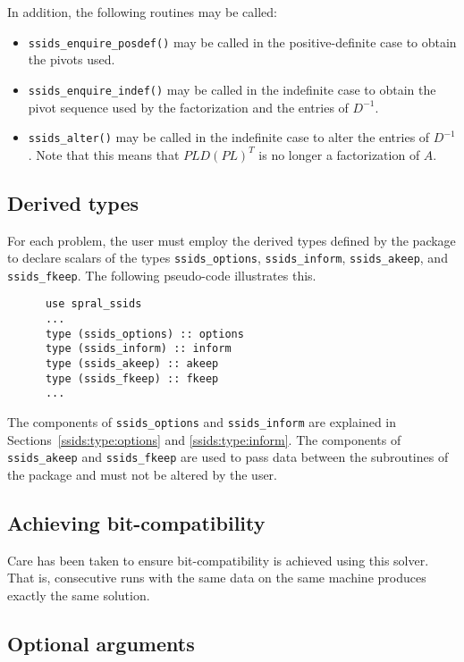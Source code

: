 \noindent
In addition, the following routines may be called:
\begin{itemize}
\item {\tt ssids\_enquire\_posdef()} may be called
in the  positive-definite case to obtain the pivots used.
\item {\tt ssids\_enquire\_indef()} may be called
in the indefinite case to obtain the pivot sequence used by the factorization
and the entries of  ${D}^{-1}$.
\item {\tt ssids\_alter()} may be called in the indefinite case to alter
the entries of ${D}^{-1}$.
Note that this means that  $PLD(PL)^T$ is no longer
a factorization of $A$.

\end{itemize}


\subsection{Derived types}

For each problem, the user must employ the derived types defined by the
package to declare scalars of the types
{\tt ssids\_options}, {\tt ssids\_inform}, {\tt ssids\_akeep}, and {\tt ssids\_fkeep}.
The following pseudo-code illustrates this.
\begin{verbatim}
      use spral_ssids
      ...
      type (ssids_options) :: options
      type (ssids_inform) :: inform
      type (ssids_akeep) :: akeep
      type (ssids_fkeep) :: fkeep
      ...
\end{verbatim}
The components of {\tt ssids\_options} and {\tt ssids\_inform} are explained
in Sections~\ref{ssids:type:options} and \ref{ssids:type:inform}.
The components of {\tt ssids\_akeep} and {\tt ssids\_fkeep} are used to pass
data between the subroutines of the package and must not be altered by the user.

\subsection{Achieving bit-compatibility}
Care has been taken to ensure bit-compatibility is achieved using this solver.
That is, consecutive runs with the same data on the same machine  produces exactly
the same solution.

\subsection{Optional arguments}

